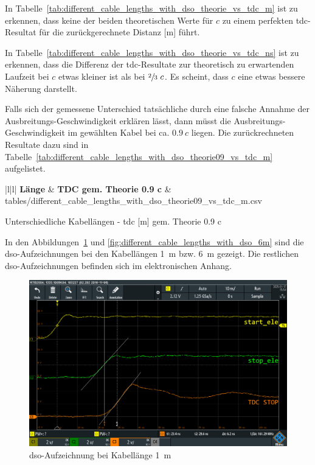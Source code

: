 In Tabelle~\ref{tab:different_cable_lengths_with_dso_theorie_vs_tdc_m} ist zu erkennen, dass keine der beiden
theoretischen Werte für $c$ zu einem perfekten \acrshort{tdc}-Resultat für die zurückgerechnete Distanz [m] führt.

In Tabelle~\ref{tab:different_cable_lengths_with_dso_theorie_vs_tdc_ns} ist zu erkennen, dass die Differenz der
\acrshort{tdc}-Resultate zur theoretisch zu erwartenden Laufzeit bei $c$ etwas kleiner ist als bei $\sfrac{2}{3}~c$. Es
scheint, dass $c$ eine etwas bessere Näherung darstellt.

Falls sich der gemessene Unterschied tatsächliche durch eine falsche Annahme der Ausbreitungs-Geschwindigkeit erklären
lässt, dann müsst die Ausbreitungs-Geschwindigkeit im gewählten Kabel bei ca. $0.9~c$ liegen. Die zurückrechneten
Resultate dazu sind in Tabelle~\ref{tab:different_cable_lengths_with_dso_theorie09_vs_tdc_m} aufgelistet.

\begin{table}[H]
    \mytable
        {|l|l|}
        {\textbf{Länge} & \textbf{TDC gem. Theorie 0.9 c}}
        {\length & \tdcgemtheoriemc}
        {tables/different_cable_lengths_with_dso_theorie09_vs_tdc_m.csv}
    \caption{Unterschiedliche Kabellängen - \acrshort{tdc} [m] gem. Theorie 0.9 c}\label{tab:different_cable_lengths_with_dso_theorie09_vs_tdc_m}
\end{table}

In den Abbildungen~\ref{fig:different_cable_lengths_with_dso_1m} und \ref{fig:different_cable_lengths_with_dso_6m} sind
die \acrshort{dso}-Aufzeichnungen bei den Kabellängen 1~m bzw. 6~m gezeigt. Die restlichen \acrshort{dso}-Aufzeichnungen
befinden sich im elektronischen Anhang.

\begin{figure}[H]
    \centering
    \includegraphics[width=\textwidth]{graphics/different_cable_lengths_with_dso_1m.png}
    \caption{\acrshort{dso}-Aufzeichnung bei Kabellänge 1~m}\label{fig:different_cable_lengths_with_dso_1m}
\end{figure}

